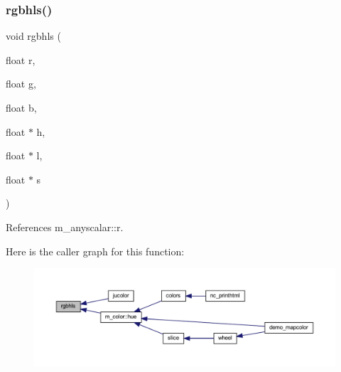 \subsubsection{\texorpdfstring{rgbhls()}{rgbhls()}}
{\footnotesize\ttfamily void rgbhls (\begin{DoxyParamCaption}\item[{float}]{r,  }\item[{float}]{g,  }\item[{float}]{b,  }\item[{float $\ast$}]{h,  }\item[{float $\ast$}]{l,  }\item[{float $\ast$}]{s }\end{DoxyParamCaption})}



References m\+\_\+anyscalar\+::r.

Here is the caller graph for this function\+:
\nopagebreak
\begin{figure}[H]
\begin{center}
\leavevmode
\includegraphics[width=350pt]{C-rgbhls_8c_abf59942f8e2e56ebf4efafcef62b2813_icgraph}
\end{center}
\end{figure}
